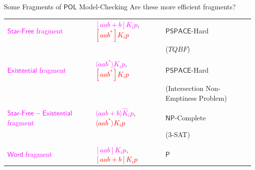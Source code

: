 \documentclass[usenames,dvipsnames]{beamer}
\newcommand\ldiaarg[1]{\langle#1\rangle}
\newcommand{\POL}{\mathsf{POL}}
\newcommand{\starfree}{\mathsf{Star\mbox{-}Free}}
\newcommand{\word}{\mathsf{Word}}
\newcommand{\existential}{\mathsf{Existential}}
\newcommand{\PSPACE}{\mathsf{PSPACE}}
\newcommand{\PTime}{\mathsf{P}}
\newcommand{\NP}{\mathsf{NP}}
\begin{document}
\begin{frame}{Some Fragments of $\POL$ Model-Checking}
    Are these more efficient fragments?
    \begin{center}
        \begin{tabular}{ m{9em} m{4cm} m{3cm} } 
         \textcolor{Fuchsia}{\textbf{$\starfree$} fragment} & \textcolor{Fuchsia}{$[aab+b]K_i p$}, \textcolor{Red}{\st{$[aab^*]K_i p$}} & $\PSPACE$-Hard \\
         & & ($TQBF$)\\
         & &\\
         \textcolor{Fuchsia}{$\existential$ fragment} & \textcolor{Fuchsia}{$\ldiaarg{aab^*}K_i p$}, \textcolor{Red}{\st{$[aab^*]K_i p$}} & $\PSPACE$-Hard \\ 
         & & (Intersection Non-Emptiness Problem)\\
         & &\\
         \textcolor{Fuchsia}{$\starfree-\existential$ fragment} & \textcolor{Fuchsia}{$\ldiaarg{aab+b}\hat{K}_i p$}, \textcolor{Red}{\st{$\ldiaarg{aab^*}K_i p$}} & $\NP$-Complete \\
         & & (3-SAT)\\
         & &\\
         \textcolor{Fuchsia}{$\word$ fragment} & \textcolor{Fuchsia}{$[aab]K_i p$}, \textcolor{Red}{\st{$[aab+b]K_i p$}} & $\PTime$
        \end{tabular}
    \end{center}
\end{frame}
\end{document}
